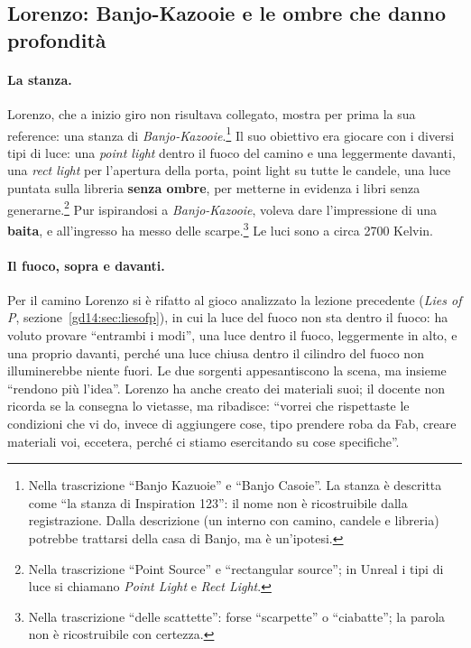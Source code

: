 \subsection{Lorenzo: Banjo-Kazooie e le ombre che danno profondità}

\paragraph{La stanza.} Lorenzo, che a inizio giro non risultava collegato, mostra per
prima la sua reference: una stanza di \emph{Banjo-Kazooie}.\footnote{Nella trascrizione
``Banjo Kazuoie'' e ``Banjo Casoie''. La stanza è descritta come ``la stanza di
Inspiration 123'': il nome non è ricostruibile dalla registrazione. Dalla descrizione
(un interno con camino, candele e libreria) potrebbe trattarsi della casa di Banjo, ma
è un'ipotesi.} Il suo obiettivo era giocare con i diversi tipi di luce: una
\emph{point light} dentro il fuoco del camino e una leggermente davanti, una
\emph{rect light} per l'apertura della porta, point light su tutte le candele, una luce
puntata sulla libreria \textbf{senza ombre}, per metterne in evidenza i libri senza
generarne.\footnote{Nella trascrizione ``Point Source'' e ``rectangular source''; in
Unreal i tipi di luce si chiamano \emph{Point Light} e \emph{Rect Light}.} Pur
ispirandosi a \emph{Banjo-Kazooie}, voleva dare l'impressione di una
\textbf{baita}, e all'ingresso ha messo delle scarpe.\footnote{Nella trascrizione
``delle scattette'': forse ``scarpette'' o ``ciabatte''; la parola non è ricostruibile
con certezza.} Le luci sono a circa 2700 Kelvin.

\paragraph{Il fuoco, sopra e davanti.} Per il camino Lorenzo si è rifatto al gioco
analizzato la lezione precedente (\emph{Lies of P}, sezione~\ref{gd14:sec:liesofp}),
in cui la luce del fuoco non sta dentro il fuoco: ha voluto provare ``entrambi i
modi'', una luce dentro il fuoco, leggermente in alto, e una proprio davanti, perché
una luce chiusa dentro il cilindro del fuoco non illuminerebbe niente fuori. Le due
sorgenti appesantiscono la scena, ma insieme ``rendono più l'idea''. Lorenzo ha anche
creato dei materiali suoi; il docente non ricorda se la consegna lo vietasse, ma
ribadisce: ``vorrei che rispettaste le condizioni che vi do, invece di aggiungere cose,
tipo prendere roba da Fab, creare materiali voi, eccetera, perché ci stiamo esercitando
su cose specifiche''.

